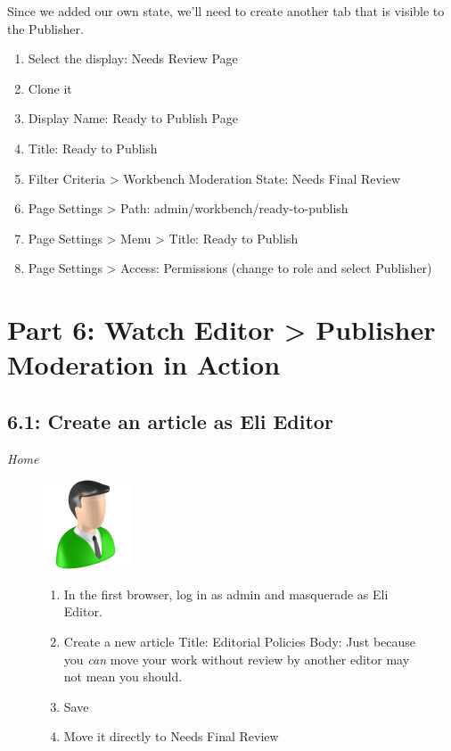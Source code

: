 \documentclass[letterpaper,10pt,english]{sphinxmanual}
\begin{document}
Since we added our own state, we'll need to create another tab that is visible to the Publisher.
\begin{enumerate}
\item {} 
Select the display: Needs Review Page

\item {} 
Clone it

\item {} 
Display Name: Ready to Publish Page

\item {} 
Title: Ready to Publish

\item {} 
Filter Criteria \textgreater{} Workbench Moderation State: Needs Final Review

\item {} 
Page Settings \textgreater{} Path: admin/workbench/ready-to-publish

\item {} 
Page Settings \textgreater{} Menu \textgreater{} Title: Ready to Publish

\item {} 
Page Settings \textgreater{} Access: Permissions (change to role and select Publisher)

\end{enumerate}


\section{Part 6: Watch Editor \textgreater{} Publisher Moderation in Action}
\label{workbench:part-6-watch-editor-publisher-moderation-in-action}

\subsection{6.1: Create an article as Eli Editor}
\label{workbench:create-an-article-as-eli-editor}
\emph{Home}
\begin{figure}[htbp]
\centering

\includegraphics{editor.png}
{\small \begin{enumerate}
\item {} 
In the first browser, log in as admin and masquerade as Eli Editor.

\item {} 
Create a new article
Title: Editorial Policies
Body:  Just because you \emph{can} move your work without review by another editor may not mean you should.

\item {} 
Save

\item {} 
Move it directly to Needs Final Review

\end{enumerate}
}\end{figure}
\end{document}
